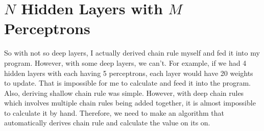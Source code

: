 \documentclass{homework}
\begin{document}
\section{$N$ Hidden Layers with $M$ Perceptrons}
So with not so deep layers, I actually derived chain rule myself and fed it into my program. However, with some deep layers, we can't. For example, if we had 4 hidden layers with each having 5 perceptrons, each layer would have 20 weights to update. That is impossible for me to calculate and feed it into the program. Also, deriving shallow chain rule was simple. However, with deep chain rules which involves multiple chain rules being added together, it is almost impossible to calculate it by hand. Therefore, we need to make an algorithm that automatically derives chain rule and calculate the value on its on.
\end{document}
